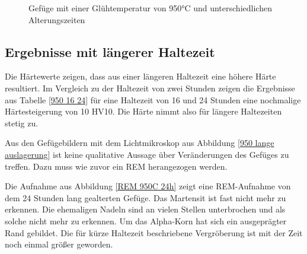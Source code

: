 \documentclass[a4paper, 11pt]{tubsreprt}
\begin{document}
\begin{figure} %
    \caption{Gefüge mit einer Glühtemperatur von 950°C und unterschiedlichen Alterungszeiten}
    \label{Glühung950+alterung}
\end{figure}
\subsection{Ergebnisse mit längerer Haltezeit}
Die Härtewerte zeigen, dass aus einer längeren Haltezeit eine höhere Härte resultiert. Im Vergleich zu der Haltezeit von zwei Stunden zeigen die Ergebnisse aus Tabelle \ref{950 16 24} für eine Haltezeit von 16 und 24 Stunden eine nochmalige Härtesteigerung von 10 HV10. Die Härte nimmt also für längere Haltezeiten stetig zu. 

Aus den Gefügebildern mit dem Lichtmikroskop aus Abbildung \ref{950 lange auslagerung} ist keine qualitative Aussage über Veränderungen des Gefüges zu treffen. Dazu muss wie zuvor ein REM herangezogen werden.

Die Aufnahme aus Abbildung \ref{REM 950C 24h} zeigt eine REM-Aufnahme von dem 24 Stunden lang gealterten Gefüge. Das Martensit ist fast nicht mehr zu erkennen. Die ehemaligen Nadeln sind an vielen Stellen unterbrochen und als solche nicht mehr zu erkennen. Um das Alpha-Korn hat sich ein ausgeprägter Rand gebildet. Die für kürze Haltezeit beschriebene Vergröberung ist mit der Zeit noch einmal größer geworden.
\end{document}
